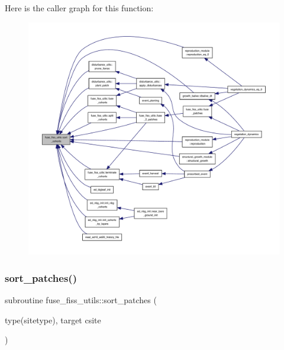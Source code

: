 Here is the caller graph for this function\+:
\nopagebreak
\begin{figure}[H]
\begin{center}
\leavevmode
\includegraphics[width=350pt]{namespacefuse__fiss__utils_a31e4835d2465d1400c7cbbb51976b341_icgraph}
\end{center}
\end{figure}
\mbox{\label{namespacefuse__fiss__utils_a546d7beff2f991a07c8fbba91921ce5f}} 
\subsubsection{\texorpdfstring{sort\+\_\+patches()}{sort\_patches()}}
{\footnotesize\ttfamily subroutine fuse\+\_\+fiss\+\_\+utils\+::sort\+\_\+patches (\begin{DoxyParamCaption}\item[{type(sitetype), target}]{csite }\end{DoxyParamCaption})}

